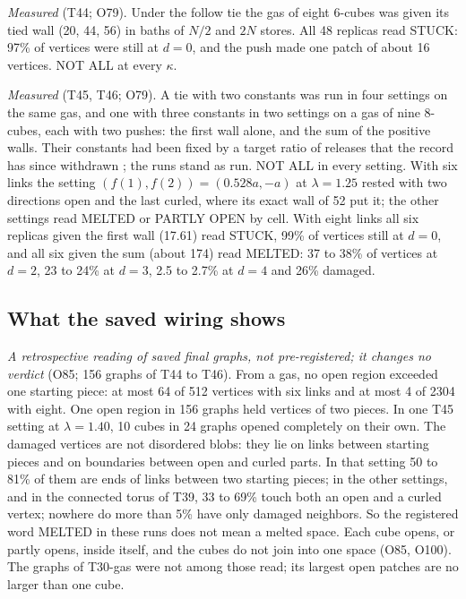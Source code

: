 \documentclass[aps,pre,10pt,twocolumn,superscriptaddress,nofootinbib]{revtex4-2}
\begin{document}
\emph{Measured} (T44; O79). Under the follow tie the gas of eight 6-cubes was given its tied wall (20, 44, 56) in
baths of $N/2$ and $2N$ stores. All 48 replicas read STUCK: 97\% of vertices were still at $d = 0$, and the push
made one patch of about 16 vertices. NOT ALL at every $\kappa$.

\emph{Measured} (T45, T46; O79). A tie with two constants was run in four settings on the same gas, and one with
three constants in two settings on a gas of nine 8-cubes, each with two pushes: the first wall alone, and the sum of
the positive walls. Their constants had been fixed by a target ratio of releases that the record has since withdrawn
\cite{repo}; the runs stand as run. NOT ALL in every setting. With six links the setting
$(f(1), f(2)) = (0.528a, -a)$ at $\lambda = 1.25$ rested with two directions open and the last curled, where its
exact wall of 52 put it; the other settings read MELTED or PARTLY OPEN by cell. With eight links all six replicas
given the first wall (17.61) read STUCK, 99\% of vertices still at $d = 0$, and all six given the sum (about 174)
read MELTED: 37 to 38\% of vertices at $d = 2$, 23 to 24\% at $d = 3$, 2.5 to 2.7\% at $d = 4$ and 26\% damaged.

\subsection{What the saved wiring shows}

\emph{A retrospective reading of saved final graphs, not pre-registered; it changes no verdict} (O85; 156 graphs of
T44 to T46). From a gas, no open region
exceeded one starting piece: at most 64 of 512 vertices with six links and at most 4 of 2304 with eight. One open
region in 156 graphs held vertices of two pieces. In one T45 setting at $\lambda = 1.40$, 10 cubes in 24 graphs
opened completely on their own. The damaged vertices are not disordered blobs: they lie on links between starting
pieces and on boundaries between open and curled parts. In that setting 50 to 81\% of them are ends of links between
two starting pieces; in the other settings, and in the connected torus of
T39, 33 to 69\% touch both an open and a curled vertex; nowhere do more than 5\% have only damaged neighbors. So the registered word MELTED in these
runs does not mean a melted space. Each cube opens, or partly opens, inside itself, and the cubes do not join into
one space (O85, O100). The graphs of T30-gas were not among those read; its largest open patches are no larger than
one cube.
\end{document}
